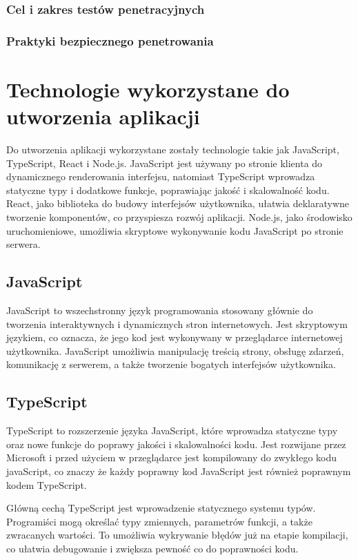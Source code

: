 \documentclass[12pt,twoside]{article}
\begin{document}
\subsubsection{Cel i zakres testów penetracyjnych}
\subsubsection{Praktyki bezpiecznego penetrowania}

\section{Technologie wykorzystane do utworzenia aplikacji}
Do utworzenia aplikacji wykorzystane zostały technologie takie jak JavaScript, TypeScript, React i Node.js. JavaScript jest używany po stronie klienta do dynamicznego renderowania interfejsu, natomiast TypeScript wprowadza statyczne typy i dodatkowe funkcje, poprawiając jakość i skalowalność kodu. React, jako biblioteka do budowy interfejsów użytkownika, ułatwia deklaratywne tworzenie komponentów, co przyspiesza rozwój aplikacji. Node.js, jako środowisko uruchomieniowe, umożliwia skryptowe wykonywanie kodu JavaScript po stronie serwera.

\subsection{JavaScript}

JavaScript to wszechstronny język programowania stosowany głównie do tworzenia interaktywnych i dynamicznych stron internetowych. Jest skryptowym językiem, co oznacza, że jego kod jest wykonywany w przeglądarce internetowej użytkownika. JavaScript umożliwia manipulację treścią strony, obsługę zdarzeń, komunikację z serwerem, a także tworzenie bogatych interfejsów użytkownika.

\subsection{TypeScript}

TypeScript to rozszerzenie języka JavaScript, które wprowadza statyczne typy oraz nowe funkcje do poprawy jakości i skalowalności kodu. Jest rozwijane przez Microsoft i przed użyciem w przeglądarce jest kompilowany do zwykłego kodu javaScript, co znaczy że każdy poprawny kod JavaScript jest również poprawnym kodem TypeScript.

Główną cechą TypeScript jest wprowadzenie statycznego systemu typów. Programiści mogą określać typy zmiennych, parametrów funkcji, a także zwracanych wartości. To umożliwia wykrywanie błędów już na etapie kompilacji, co ułatwia debugowanie i zwiększa pewność co do poprawności kodu.
\end{document}
